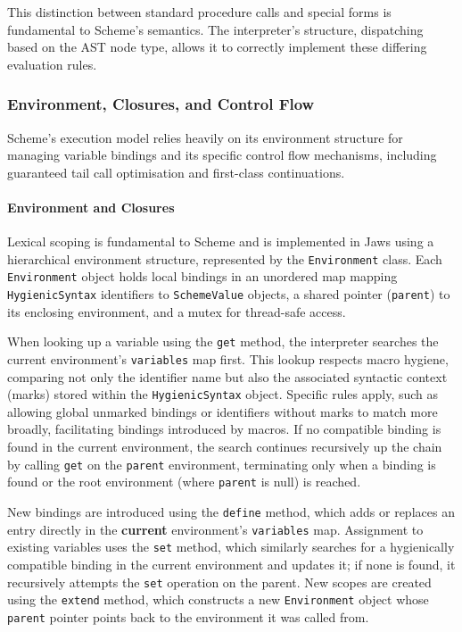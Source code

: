 \documentclass[final]{cmpreport_02}
\begin{document}
This distinction between standard procedure calls and special forms is fundamental to Scheme's semantics. The interpreter's structure, dispatching based on the AST node type, allows it to correctly implement these differing evaluation rules.

\subsubsection{Environment, Closures, and Control Flow}

Scheme's execution model relies heavily on its environment structure for managing variable bindings and its specific control flow mechanisms, including guaranteed tail call optimisation and first-class continuations.

\paragraph{Environment and Closures}
Lexical scoping is fundamental to Scheme and is implemented in Jaws using a hierarchical environment structure, represented by the \texttt{Environment} class. Each \texttt{Environment} object holds local bindings in an unordered map mapping \texttt{HygienicSyntax} identifiers to \texttt{SchemeValue} objects, a shared pointer (\texttt{parent}) to its enclosing environment, and a mutex for thread-safe access.

When looking up a variable using the \texttt{get} method, the interpreter searches the current environment's \texttt{variables} map first. This lookup respects macro hygiene, comparing not only the identifier name but also the associated syntactic context (marks) stored within the \texttt{HygienicSyntax} object. Specific rules apply, such as allowing global unmarked bindings or identifiers without marks to match more broadly, facilitating bindings introduced by macros. If no compatible binding is found in the current environment, the search continues recursively up the chain by calling \texttt{get} on the \texttt{parent} environment, terminating only when a binding is found or the root environment (where \texttt{parent} is null) is reached.

New bindings are introduced using the \texttt{define} method, which adds or replaces an entry directly in the \textbf{current} environment's \texttt{variables} map. Assignment to existing variables uses the \texttt{set} method, which similarly searches for a hygienically compatible binding in the current environment and updates it; if none is found, it recursively attempts the \texttt{set} operation on the parent. New scopes are created using the \texttt{extend} method, which constructs a new \texttt{Environment} object whose \texttt{parent} pointer points back to the environment it was called from.
\end{document}
